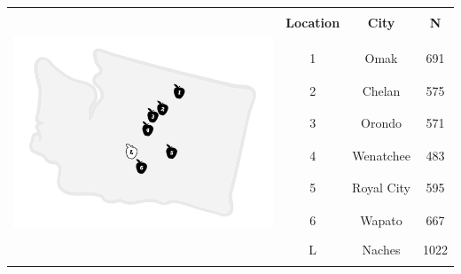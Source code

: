 
		\begin{tabular*}{150mm}{@{\extracolsep{\fill}}cccc}
		\hline	
		\hline		
		 & & \\
		& {\bf{Location}} & {\bf{City}} & {\bf{N}} \\
		\multirow{13}{*}{ \includegraphics[trim=0 0 0 0,clip,width=80mm]{graphics/AppleMap_trim.pdf} } & & \\
		\cline{2-4}
		 & & \\
		& {1}		& Omak		& 691 \\
		 & & \\
		& {2}		& Chelan	& 575 \\
		 & & \\
		& {3}		& Orondo	& 571 \\
		 & & \\
		& {4}		& Wenatchee	& 483 \\
		 & & \\
		& {5}		& Royal City	& 595 \\
		 & & \\
		& {6}		& Wapato	& 667  \\
		 & & \\
		& {L}		& Naches	& 1022 \\
		 & & \\
		\hline
		\hline
		\end{tabular*}
			